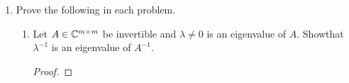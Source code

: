 \documentclass{article}
\begin{document}
\begin{enumerate}
\begin{proof}
\end{proof}

\begin{proof}

\textbf{(Lower Triangular, by case of Upper Triangular)}

Assume as before,  $A \in \C^{m \times m}$ is unitary and is lower triangular such that,

\[ 
    A^*A = \mathrm{I}_m = AA^*
\]

\[
    A = \left[\begin{array}{c c c c}
        a_{11} & 0 & \cdots & 0 \\
        a_{21} & a_{22} & \cdots & 0 \\
        \vdots & \vdots & \ddots & \vdots \\
        a_{m1} & a_{m2} & \cdots  & a_{mm}
        \end{array}\right]
\] 

Where $A^*$ is the complex transpose matrix of $A$. We have then that $A^*$ is of the form, 

\[
    A^* = \left[\begin{array}{c c c c}
        \overline{a_{11}} & \overline{a_{21}} & \cdots & \overline{a_{m1}} \\
        0 & \overline{a_{22}} & \cdots & \overline{a_{m2}} \\
        \vdots & \vdots & \ddots & \vdots \\
        0 & 0 & \cdots  & \overline{a_{mm}}
        \end{array}\right]
\] 

We then define the matrix $C = A^*$, $C^* = A$. Notice that C is an upper triangular, unitary matrix. By the previous proof, $C$ is a diagonal matrix. Notice all of its ``off-diagonal'' elements are zero. As a consequnce, all (i, j)-elements of $C$ which are zero imply that (j, i)-elements of $C^*$ are zero. Therefore, $C^* = A$ is a diagonal matrix.


\end{proof}

\item 
Prove the following in each problem.
\begin{enumerate}
\item
Let $A \in \C^{m \times m}$ be invertible and $\lambda \neq 0$ is an eigenvalue of $A$. Showthat $\lambda^{-1}$ is an eigenvalue of $A^{-1}$.

\begin{proof}


\end{proof}
\end{enumerate}
\end{enumerate}
\end{document}
